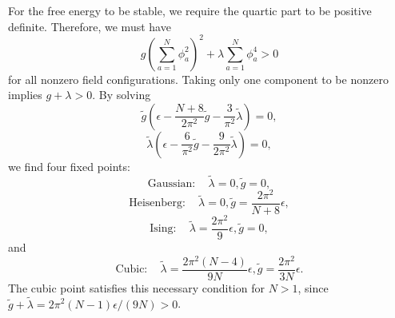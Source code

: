\begin{solution}
    For the free energy to be stable, we require the quartic part to be positive definite. Therefore, we must have
    \begin{equation}
        g \left(\sum_{a=1}^N\phi_a^2\right)^2 + \lambda\sum_{a=1}^N\phi_a^4 > 0
    \end{equation}
    for all nonzero field configurations. Taking only one component to be nonzero implies $g+\lambda>0$.
    By solving
    \begin{equation}
        \tilde g \left(\epsilon
    -\frac{N+8}{2\pi^2}\tilde g
    -\frac3{\pi^2}\tilde\lambda\right)=0,
    \end{equation}
    \begin{equation}
        \tilde \lambda\left(\epsilon
    -\frac6{\pi^2}\tilde g
    -\frac9{2\pi^2}\tilde\lambda\right) = 0,
    \end{equation}
    we find four fixed points:
    \begin{equation}
        \mathrm{Gaussian:}\quad\tilde \lambda = 0, \tilde g = 0,
    \end{equation}
    \begin{equation}
        \mathrm{Heisenberg:}\quad \tilde \lambda = 0 ,\tilde g = \frac{2\pi^2}{N+8}\epsilon,
    \end{equation}
    \begin{equation}
        \mathrm{Ising:}\quad \tilde \lambda = \frac{2\pi^2}{9}\epsilon ,\tilde g = 0,
    \end{equation}
    and
    \begin{equation}
        \mathrm{Cubic:}\quad \tilde \lambda = \frac{2\pi^2(N-4)}{9N}\epsilon ,\tilde g = \frac{2\pi^2}{3N}\epsilon.
    \end{equation}
    The cubic point satisfies this necessary condition for $N>1$, since
    $\tilde g+\tilde\lambda=2\pi^2(N-1)\epsilon/(9N)>0$.


\end{solution}
